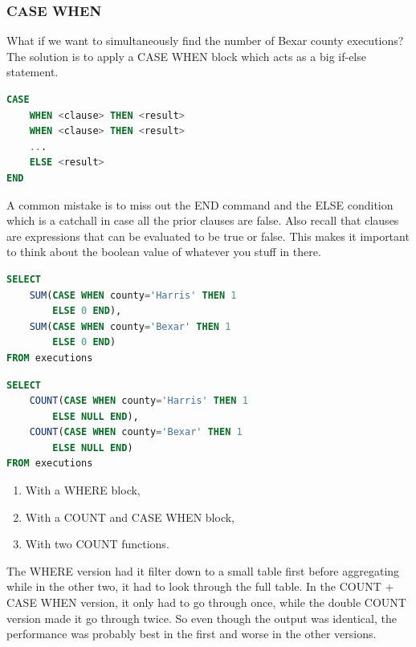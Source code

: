 \documentclass{article}
\begin{document}
\subsubsection{CASE WHEN }

What if we want to simultaneously find the number of Bexar county executions? The solution is to apply a CASE WHEN block which acts as a big if-else statement.

\vspace{8pt} \begin{lstlisting}[language=SQL]
CASE
    WHEN <clause> THEN <result>
    WHEN <clause> THEN <result>
    ...
    ELSE <result>
END
\end{lstlisting} \vspace{8pt}

A common mistake is to miss out the END command and the ELSE condition which is a catchall in case all the prior clauses are false. Also recall that clauses are expressions that can be evaluated to be true or false. This makes it important to think about the boolean value of whatever you stuff in there.

\vspace{8pt} \begin{lstlisting}[language=SQL]
SELECT
    SUM(CASE WHEN county='Harris' THEN 1
        ELSE 0 END),
    SUM(CASE WHEN county='Bexar' THEN 1
        ELSE 0 END)
FROM executions
\end{lstlisting} \vspace{8pt}

\vspace{8pt} \begin{lstlisting}[language=SQL]
SELECT
    COUNT(CASE WHEN county='Harris' THEN 1
        ELSE NULL END),
    COUNT(CASE WHEN county='Bexar' THEN 1
        ELSE NULL END)
FROM executions
\end{lstlisting} \vspace{8pt}

\begin{enumerate}
    \item With a WHERE block,
    \item With a COUNT and CASE WHEN block,
    \item With two COUNT functions.
\end{enumerate}

The WHERE version had it filter down to a small table first before aggregating while in the other two, it had to look through the full table. In the COUNT + CASE WHEN version, it only had to go through once, while the double COUNT version made it go through twice. So even though the output was identical, the performance was probably best in the first and worse in the other versions.
\end{document}
